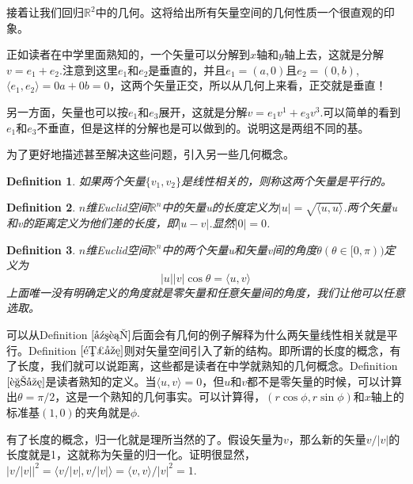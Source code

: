 \documentclass[11pt,a4paper,openany]{book}%
\theoremstyle{plain}%
\newtheorem{defi}{Definition}[chapter]%
\newcommand{\dref}[1]{{\rm Definition} $\ref{#1}$}%
\begin{document}
接着让我们回归$\mathbb{R}^{2}$中的几何。这将给出所有矢量空间的几何性质一个很直观的印象。\\
\begin{center}
\end{center}
\indent 正如读者在中学里面熟知的，一个矢量可以分解到$x$轴和$y$轴上去，这就是分解$v=e_1+e_2$.注意到这里$e_1$和$e_2$是垂直的，并且$e_1=(a,0)$且$e_2=(0,b)$,$\langle e_1,e_2\rangle=0a+0b=0$，这两个矢量正交，所以从几何上来看，正交就是垂直！

另一方面，矢量也可以按$e_1$和$e_3$展开，这就是分解$v=e_1v^1+e_3v^3$.可以简单的看到$e_1$和$e_3$不垂直，但是这样的分解也是可以做到的。说明这是两组不同的基。

为了更好地描述甚至解决这些问题，引入另一些几何概念。
\begin{defi}
\label{平行}
如果两个矢量$\{v_1,v_2\}$是线性相关的，则称这两个矢量是平行的。
\end{defi}
\begin{defi}
\label{长度}
$n$维Euclid空间$\mathbb{R}^{n}$中的矢量u的长度定义为$|u|=\sqrt{\langle u,u\rangle}$.两个矢量u和v的距离定义为他们差的长度，即$|u-v|$.显然$|0|=0$.
\end{defi}
\begin{defi}
\label{角度}
$n$维Euclid空间$\mathbb{R}^{n}$中的两个矢量u和矢量v间的角度$\theta$$(\theta \in [0,\pi))$定义为
\[
|u||v|\cos \theta=\langle u,v \rangle
\]
上面唯一没有明确定义的角度就是零矢量和任意矢量间的角度，我们让他可以任意选取。
\end{defi}

\indent 可以从\dref{平行}后面会有几何的例子解释为什么两矢量线性相关就是平行。\dref{长度}则对矢量空间引入了新的结构。即所谓的长度的概念，有了长度，我们就可以说距离，这些都是读者在中学就熟知的几何概念。\dref{角度}是读者熟知的定义。当$\langle u,v \rangle=0$，但$u$和$v$都不是零矢量的时候，可以计算出$\theta=\pi/2$，这是一个熟知的几何事实。可以计算得，$(r\cos \phi,r\sin \phi)$和$x$轴上的标准基$(1,0)$的夹角就是$\phi$.

有了长度的概念，归一化就是理所当然的了。假设矢量为$v$，那么新的矢量$v/|v|$的长度就是1，这就称为矢量的归一化。证明很显然，$|v/|v||^2=\langle v/|v|,v/|v|\rangle=\langle v,v\rangle/|v|^2=1$.
\end{document}
